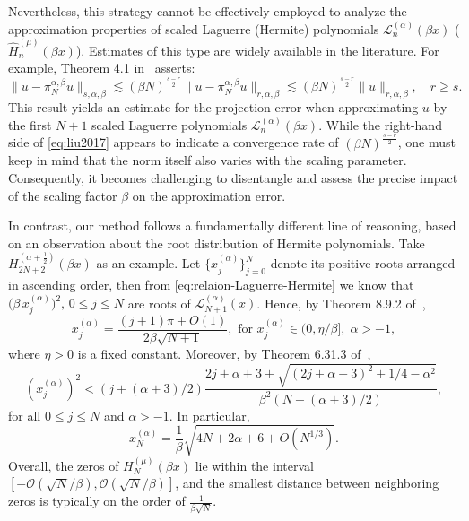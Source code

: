 \documentclass[pdflatex,sn-aps]{sn-jnl}%
\theoremstyle{thmstyleone}%
\theoremstyle{thmstyletwo}%
\theoremstyle{thmstylethree}%
\begin{document}
Nevertheless, this strategy cannot be effectively employed to
analyze the approximation properties of scaled Laguerre (Hermite)
polynomials $\mathscr{L}_n^{(\alpha)}(\beta x)$ ($\widehat{H}_n^{(\mu)}(\beta x)$). 
Estimates of this type are widely available in the literature.
For example, Theorem 4.1 in~\cite{liu2017fully} asserts:
\begin{equation}\label{eq:liu2017}
  \bigl\|u-\pi_N^{\alpha, \beta} u\bigr\|_{s, \alpha, \beta} \lesssim(\beta N)^{\frac{s-r}{2}}\bigl\|u-\pi_N^{\alpha, \beta} u\bigr\|_{r, \alpha, \beta} \lesssim(\beta N)^{\frac{s-r}{2}}\|u\|_{r, \alpha, \beta}, \quad r \geq s.
\end{equation}
This result yields an estimate for the projection error when approximating 
$u$ by the first $N+1$ scaled Laguerre polynomials $\mathscr{L}_n^{(\alpha)}(\beta x)$.
While the right-hand side of \eqref{eq:liu2017} appears to indicate a convergence rate of $(\beta N)^{\frac{s-r}{2}}$, one must keep in mind that the norm itself also varies with the scaling parameter. Consequently, it becomes challenging to disentangle and assess the precise impact of the scaling factor $\beta$ on the approximation error.

In contrast, our method follows a fundamentally different line of reasoning, based on an observation about the root distribution of Hermite polynomials. Take $H_{2N+2}^{(\alpha + \frac{1}{2})}(\beta x)$ as an example. Let $\{x_j^{(\alpha)}\}_{j=0}^N$ denote its positive roots arranged in ascending order, then from \eqref{eq:relaion-Laguerre-Hermite} we know that $ \bigl(\beta\, x_j^{(\alpha)}\bigr)^2,\, 0\leqslant j \leqslant N$
are roots of $\mathscr{L}_{N+1}^{(\alpha)}(x)$. Hence, by Theorem 8.9.2 of~\cite{szego1975orthogonal},
\begin{equation}\label{eq:shen2011-7.42}
  x_j^{(\alpha)}=\frac{(j+1) \pi+O(1)}{2\beta \sqrt{N+1}}, \text { for } x_j^{(\alpha)} \in(0, \eta/\beta],\; \alpha>-1,
\end{equation}
where $\eta > 0$ is a fixed constant. Moreover, by Theorem 6.31.3 of~\cite{szego1975orthogonal},
\begin{equation}\label{eq:shen2011-7.43}
  \left(x_j^{(\alpha)}\right)^2<(j+(\alpha+3) / 2) \frac{2 j+\alpha+3+\sqrt{(2 j+\alpha+3)^2+1 / 4-\alpha^2}}{\beta^2 \left(N+(\alpha+3) / 2\right)},
\end{equation}
for all $0 \leqslant j \leqslant N$ and $\alpha > -1$. In particular,
\begin{equation}\label{eq:shen2011-7.44}
  x_N^{(\alpha)}=\frac{1}{\beta}\sqrt{4 N+2 \alpha+6+O\left(N^{1 / 3}\right)}.
\end{equation}
Overall, the zeros of $H_N^{(\mu)}(\beta x)$ lie within the interval
$\left[-\mathcal{O}\left(\sqrt{N}/\beta\right), \mathcal{O}\left(\sqrt{N}/\beta\right)\right]$, and the smallest distance between neighboring zeros is typically on the order of $\frac{1}{\beta \sqrt{N}}$.
\end{document}
